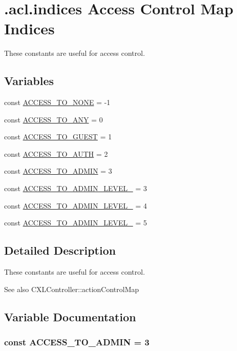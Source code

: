 \hypertarget{group__constants}{
\section{.acl.indices Access Control Map Indices}
\label{group__constants}
}


These constants are useful for access control.  


\subsection*{Variables}
\begin{DoxyCompactItemize}
\item 
const \hyperlink{group__constants_ga63d56389fe1e58d0b097471ca4f4dc00}{ACCESS\_\-TO\_\-NONE} = -\/1
\item 
const \hyperlink{group__constants_ga8b17406db740d630ae61ecf3cd9bbd8c}{ACCESS\_\-TO\_\-ANY} = 0
\item 
const \hyperlink{group__constants_gaaef8a39bfe4d39dca0f45fdb837a8d59}{ACCESS\_\-TO\_\-GUEST} = 1
\item 
const \hyperlink{group__constants_ga437b41cb9e13e41157d57e7736366295}{ACCESS\_\-TO\_\-AUTH} = 2
\item 
const \hyperlink{group__constants_ga16a362e48c9f7e6757bb15e0a3d9fa4f}{ACCESS\_\-TO\_\-ADMIN} = 3
\item 
const \hyperlink{group__constants_ga6a8da045f81793625a0cb332106e71ba}{ACCESS\_\-TO\_\-ADMIN\_\-LEVEL\_} = 3
\item 
const \hyperlink{group__constants_ga3b271ad21d11058b550be5ab9599cce3}{ACCESS\_\-TO\_\-ADMIN\_\-LEVEL\_} = 4
\item 
const \hyperlink{group__constants_gaff610796a797e6a609363e5ab6028ca0}{ACCESS\_\-TO\_\-ADMIN\_\-LEVEL\_} = 5
\end{DoxyCompactItemize}


\subsection{Detailed Description}
These constants are useful for access control. \begin{DoxySeeAlso}{See also}
CXLController::actionControlMap 
\end{DoxySeeAlso}


\subsection{Variable Documentation}
\hypertarget{group__constants_ga16a362e48c9f7e6757bb15e0a3d9fa4f}{
\subsubsection[{ACCESS\_\-TO\_\-ADMIN}]{\setlength{\rightskip}{0pt plus 5cm}const ACCESS\_\-TO\_\-ADMIN = 3}}
\label{group__constants_ga16a362e48c9f7e6757bb15e0a3d9fa4f}


